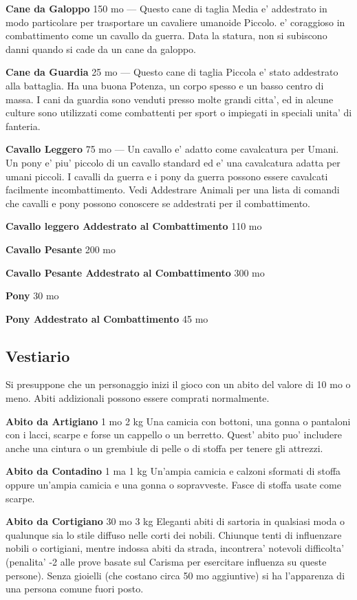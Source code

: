 \documentclass[a4paper,11pt,twoside,openany]{dndbook}
\begin{document}
{\textbf{Cane da Galoppo} 150 mo --- Questo cane di taglia Media e' addestrato in modo particolare per trasportare un cavaliere umanoide Piccolo. e' coraggioso in combattimento come un cavallo da guerra. Data la statura, non si subiscono danni quando si cade da un cane da galoppo.

\textbf{Cane da Guardia} 25 mo --- Questo cane di taglia Piccola e' stato addestrato alla battaglia. Ha una buona Potenza, un corpo spesso e un basso centro di massa. I cani da guardia sono venduti presso molte grandi citta', ed in alcune culture sono utilizzati come combattenti per sport o impiegati in speciali unita' di fanteria.

\textbf{Cavallo Leggero} 75 mo --- Un cavallo e' adatto come cavalcatura per Umani. Un pony e' piu' piccolo di un cavallo standard ed e' una cavalcatura adatta per umani piccoli. I cavalli da guerra e i pony da guerra possono essere cavalcati facilmente incombattimento.
Vedi Addestrare Animali per una lista di comandi che cavalli e pony possono conoscere se addestrati per il combattimento.

\textbf{Cavallo leggero Addestrato al Combattimento} 110 mo

\textbf{Cavallo Pesante} 200 mo

\textbf{Cavallo Pesante Addestrato al Combattimento} 300 mo

\textbf{Pony} 30 mo

\textbf{Pony Addestrato al Combattimento} 45 mo

\pagebreak

\subsection{Vestiario}

\label{vestiario}

Si presuppone che un personaggio inizi il gioco con un abito del valore di 10 mo o meno. Abiti addizionali possono essere comprati normalmente.

\textbf{Abito da Artigiano} 1 mo 2 kg Una camicia con bottoni, una gonna o pantaloni con i lacci, scarpe e forse un cappello o un berretto. Quest' abito puo' includere anche una cintura o un grembiule di pelle o di stoffa per tenere gli attrezzi.

\textbf{Abito da Contadino} 1 ma 1 kg Un'ampia camicia e calzoni sformati di stoffa oppure un'ampia camicia e una gonna o sopravveste. Fasce di stoffa usate come scarpe.

\textbf{Abito da Cortigiano} 30 mo 3 kg Eleganti abiti di sartoria in qualsiasi moda o qualunque sia lo stile diffuso nelle corti dei nobili. Chiunque tenti di influenzare nobili o cortigiani, mentre indossa abiti da strada, incontrera' notevoli difficolta' (penalita' -2 alle prove basate sul Carisma per esercitare influenza su queste persone). Senza gioielli (che costano circa 50 mo aggiuntive) si ha l'apparenza di una persona comune fuori posto.

}
\end{document}
